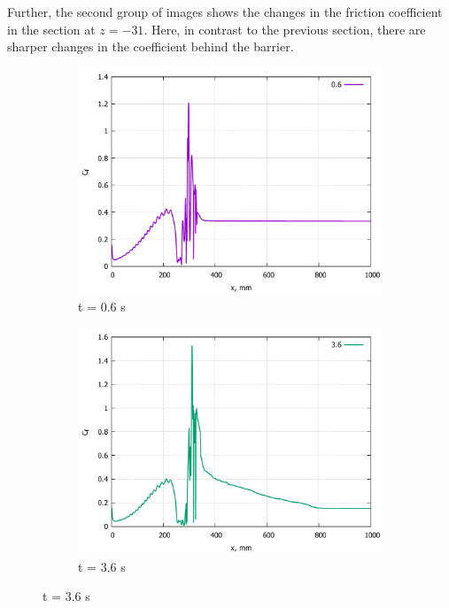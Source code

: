 	Further, the second group of images shows the changes in the friction coefficient in the section at $z = -31$. Here, in contrast to the previous section, there are sharper changes in the coefficient behind the barrier.
	\begin{figure}[H]
		\begin{subfigure}{.5\textwidth}
			\centering
			\includegraphics[width=1\linewidth]{../Assets/Cf-T06-31m}
			\caption{t = 0.6 s}
			\label{fig:Cf-T06-31m}
		\end{subfigure}%
		\begin{subfigure}{.5\textwidth}
			\centering
			\includegraphics[width=1\linewidth]{../Assets/Cf-T360-31m}
			\caption{t = 3.6 s}
			\label{fig:Cf-T360-31m}
		\end{subfigure}

\end{figure}
